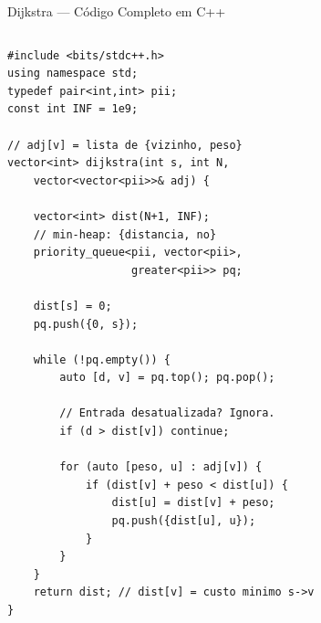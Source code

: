 \documentclass[aspectratio=169,10pt]{beamer}
\begin{document}
\begin{frame}[fragile,shrink=3]{Dijkstra --- Código Completo em C++}
  \begin{columns}[t]
      \begin{tcolorbox}[caixaCodigo]
        \begin{lstlisting}[style=cppsmall]
#include <bits/stdc++.h>
using namespace std;
typedef pair<int,int> pii;
const int INF = 1e9;

// adj[v] = lista de {vizinho, peso}
vector<int> dijkstra(int s, int N,
    vector<vector<pii>>& adj) {

    vector<int> dist(N+1, INF);
    // min-heap: {distancia, no}
    priority_queue<pii, vector<pii>,
                   greater<pii>> pq;

    dist[s] = 0;
    pq.push({0, s});

    while (!pq.empty()) {
        auto [d, v] = pq.top(); pq.pop();

        // Entrada desatualizada? Ignora.
        if (d > dist[v]) continue;

        for (auto [peso, u] : adj[v]) {
            if (dist[v] + peso < dist[u]) {
                dist[u] = dist[v] + peso;
                pq.push({dist[u], u});
            }
        }
    }
    return dist; // dist[v] = custo minimo s->v
}


\end{lstlisting}
\end{tcolorbox}
\end{columns}
\end{frame}
\end{document}
